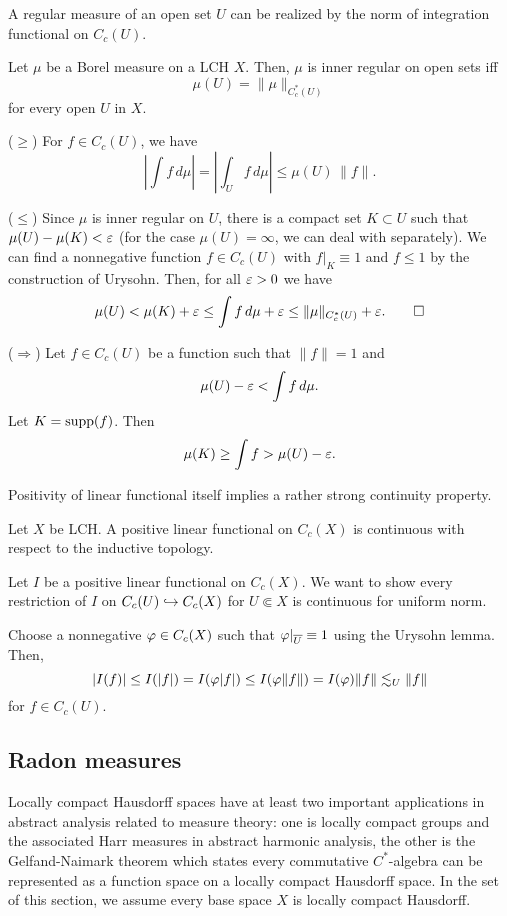 \documentclass{../exp}
\begin{document}
A regular measure of an open set $U$ can be realized by the norm of integration functional on $C_c(U)$.
\begin{lem}
Let $\mu$ be a Borel measure on a LCH $X$.
Then, $\mu$ is inner regular on open sets iff
\[\mu(U)=\|\mu\|_{C_c^*(U)}\]
for every open $U$ in $X$.
\end{lem}
\begin{pf}
($\ge$)
For $f\in C_c(U)$, we have
\[|\int f\,d\mu|=|\int_Uf\,d\mu|\le\mu(U)\,\|f\|.\]

($\le$)
Since $\mu$ is inner regular on $U$, there is a compact set $K\subset U$ such that $\mu(U)-\mu(K)<\varepsilon$ (for the case $\mu(U)=\infty$, we can deal with separately).
We can find a nonnegative function $f\in C_c(U)$ with $f|_K \equiv 1$ and $f\le1$ by the construction of Urysohn.
Then, for all $\varepsilon>0$ we have
\[\mu(U)<\mu(K)+\varepsilon\le\int f\,d\mu+\varepsilon\le\|\mu\|_{C_c^*(U)}+\varepsilon.\qedhere\]

($\Rightarrow$)
Let $f\in C_c(U)$ be a function such that $\|f\|=1$ and
\[\mu(U)-\varepsilon<\int f\,d\mu.\]
Let $K=\operatorname{supp}(f)$.
Then
\[\mu(K)\ge\int f>\mu(U)-\varepsilon.\]
\end{pf}


Positivity of linear functional itself implies a rather strong continuity property.
\begin{thm}
Let $X$ be LCH.
A positive linear functional on $C_c(X)$ is continuous with respect to the inductive topology.
\end{thm}
\begin{pf}
Let $I$ be a positive linear functional on $C_c(X)$.
We want to show every restriction of $I$ on $C_c(U)\hookrightarrow C_c(X)$ for $U\Subset X$ is continuous for uniform norm.

Choose a nonnegative $\varphi\in C_c(X)$ such that $\varphi|_{\overline{U}}\equiv1$ using the Urysohn lemma.
Then,
\[|I(f)|\le I(|f|)=I(\varphi|f|)\le I(\varphi\|f\|)=I(\varphi)\|f\|\lesssim_U\|f\|\]
for $f\in C_c(U)$.
\end{pf}

\subsection{Radon measures}

Locally compact Hausdorff spaces have at least two important applications in abstract analysis related to measure theory: one is locally compact groups and the associated Harr measures in abstract harmonic analysis, the other is the Gelfand-Naimark theorem which states every commutative $C^*$-algebra can be represented as a function space on a locally compact Hausdorff space.
In the set of this section, we assume every base space $X$ is locally compact Hausdorff.
\end{document}
